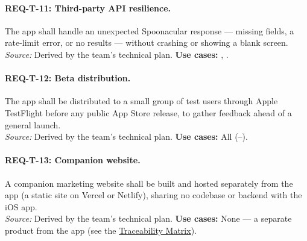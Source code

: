 \paragraph{REQ-T-11: Third-party API resilience.}
 The app shall handle an unexpected Spoonacular response --- missing fields, a rate-limit error, or no results --- without crashing or showing a blank screen.\\
\textit{Source:} Derived by the team's technical plan. \textbf{Use cases:} , .

\paragraph{REQ-T-12: Beta distribution.}
 The app shall be distributed to a small group of test users through Apple TestFlight before any public App Store release, to gather feedback ahead of a general launch.\\
\textit{Source:} Derived by the team's technical plan. \textbf{Use cases:} All (--).

\paragraph{REQ-T-13: Companion website.}
 A companion marketing website shall be built and hosted separately from the app (a static site on Vercel or Netlify), sharing no codebase or backend with the iOS app.\\
\textit{Source:} Derived by the team's technical plan. \textbf{Use cases:} None --- a separate product from the app (see the \hyperref[Chapter:Traceability]{Traceability Matrix}).
